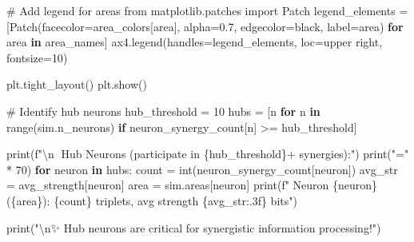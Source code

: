 \documentclass[
  11pt,
  letterpaper,
  oneside,
  openany]{book}
\newenvironment{Shaded}{\begin{snugshade}}{\end{snugshade}}
\newcommand{\BuiltInTok}[1]{\textcolor[rgb]{0.00,0.23,0.31}{#1}}
\newcommand{\CharTok}[1]{\textcolor[rgb]{0.13,0.47,0.30}{#1}}
\newcommand{\CommentTok}[1]{\textcolor[rgb]{0.37,0.37,0.37}{#1}}
\newcommand{\ControlFlowTok}[1]{\textcolor[rgb]{0.00,0.23,0.31}{\textbf{#1}}}
\newcommand{\DecValTok}[1]{\textcolor[rgb]{0.68,0.00,0.00}{#1}}
\newcommand{\FloatTok}[1]{\textcolor[rgb]{0.68,0.00,0.00}{#1}}
\newcommand{\ImportTok}[1]{\textcolor[rgb]{0.00,0.46,0.62}{#1}}
\newcommand{\KeywordTok}[1]{\textcolor[rgb]{0.00,0.23,0.31}{\textbf{#1}}}
\newcommand{\NormalTok}[1]{\textcolor[rgb]{0.00,0.23,0.31}{#1}}
\newcommand{\OperatorTok}[1]{\textcolor[rgb]{0.37,0.37,0.37}{#1}}
\newcommand{\SpecialCharTok}[1]{\textcolor[rgb]{0.37,0.37,0.37}{#1}}
\newcommand{\SpecialStringTok}[1]{\textcolor[rgb]{0.13,0.47,0.30}{#1}}
\newcommand{\StringTok}[1]{\textcolor[rgb]{0.13,0.47,0.30}{#1}}
\begin{document}
\begin{Shaded}
\begin{Highlighting}[]
\CommentTok{\# Add legend for areas}
\ImportTok{from}\NormalTok{ matplotlib.patches }\ImportTok{import}\NormalTok{ Patch}
\NormalTok{legend\_elements }\OperatorTok{=}\NormalTok{ [Patch(facecolor}\OperatorTok{=}\NormalTok{area\_colors[area], alpha}\OperatorTok{=}\FloatTok{0.7}\NormalTok{, }
\NormalTok{                        edgecolor}\OperatorTok{=}\StringTok{\textquotesingle{}black\textquotesingle{}}\NormalTok{, label}\OperatorTok{=}\NormalTok{area) }
                  \ControlFlowTok{for}\NormalTok{ area }\KeywordTok{in}\NormalTok{ area\_names]}
\NormalTok{ax4.legend(handles}\OperatorTok{=}\NormalTok{legend\_elements, loc}\OperatorTok{=}\StringTok{\textquotesingle{}upper right\textquotesingle{}}\NormalTok{, fontsize}\OperatorTok{=}\DecValTok{10}\NormalTok{)}

\NormalTok{plt.tight\_layout()}
\NormalTok{plt.show()}

\CommentTok{\# Identify hub neurons}
\NormalTok{hub\_threshold }\OperatorTok{=} \DecValTok{10}
\NormalTok{hubs }\OperatorTok{=}\NormalTok{ [n }\ControlFlowTok{for}\NormalTok{ n }\KeywordTok{in} \BuiltInTok{range}\NormalTok{(sim.n\_neurons) }\ControlFlowTok{if}\NormalTok{ neuron\_synergy\_count[n] }\OperatorTok{\textgreater{}=}\NormalTok{ hub\_threshold]}

\BuiltInTok{print}\NormalTok{(}\SpecialStringTok{f"}\CharTok{\textbackslash{}n}\SpecialStringTok{🌟 Hub Neurons (participate in }\SpecialCharTok{\{}\NormalTok{hub\_threshold}\SpecialCharTok{\}}\SpecialStringTok{+ synergies):"}\NormalTok{)}
\BuiltInTok{print}\NormalTok{(}\StringTok{"="} \OperatorTok{*} \DecValTok{70}\NormalTok{)}
\ControlFlowTok{for}\NormalTok{ neuron }\KeywordTok{in}\NormalTok{ hubs:}
\NormalTok{    count }\OperatorTok{=} \BuiltInTok{int}\NormalTok{(neuron\_synergy\_count[neuron])}
\NormalTok{    avg\_str }\OperatorTok{=}\NormalTok{ avg\_strength[neuron]}
\NormalTok{    area }\OperatorTok{=}\NormalTok{ sim.areas[neuron]}
    \BuiltInTok{print}\NormalTok{(}\SpecialStringTok{f"  Neuron }\SpecialCharTok{\{}\NormalTok{neuron}\SpecialCharTok{\}}\SpecialStringTok{ (}\SpecialCharTok{\{}\NormalTok{area}\SpecialCharTok{\}}\SpecialStringTok{): }\SpecialCharTok{\{}\NormalTok{count}\SpecialCharTok{\}}\SpecialStringTok{ triplets, avg strength }\SpecialCharTok{\{}\NormalTok{avg\_str}\SpecialCharTok{:.3f\}}\SpecialStringTok{ bits"}\NormalTok{)}

\BuiltInTok{print}\NormalTok{(}\StringTok{"}\CharTok{\textbackslash{}n}\StringTok{✨ Hub neurons are critical for synergistic information processing!"}\NormalTok{)}
\end{Highlighting}
\end{Shaded}
\end{document}
